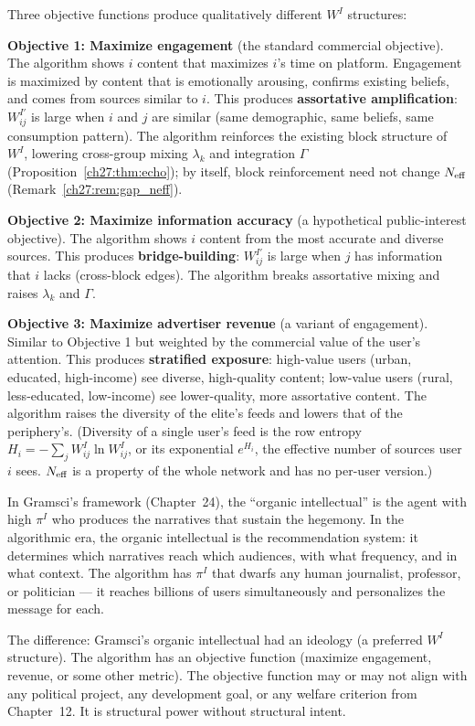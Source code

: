 \documentclass[../structural_economics_book.tex]{subfiles}
\begin{document}
\begin{conjecture}\label{ch27:prop:objective}
Three objective functions produce qualitatively different $W^I$ structures:

\textbf{Objective 1: Maximize engagement} (the standard commercial objective). The algorithm shows $i$ content that maximizes $i$'s time on platform. Engagement is maximized by content that is emotionally arousing, confirms existing beliefs, and comes from sources similar to $i$. This produces \textbf{assortative amplification}: $W^{I'}_{ij}$ is large when $i$ and $j$ are similar (same demographic, same beliefs, same consumption pattern). The algorithm reinforces the existing block structure of $W^I$, lowering cross-group mixing $\lambda_k$ and integration $\Gamma$ (Proposition~\ref{ch27:thm:echo}); by itself, block reinforcement need not change $N_{\text{eff}}$ (Remark~\ref{ch27:rem:gap_neff}).

\textbf{Objective 2: Maximize information accuracy} (a hypothetical public-interest objective). The algorithm shows $i$ content from the most accurate and diverse sources. This produces \textbf{bridge-building}: $W^{I'}_{ij}$ is large when $j$ has information that $i$ lacks (cross-block edges). The algorithm breaks assortative mixing and raises $\lambda_k$ and $\Gamma$.

\textbf{Objective 3: Maximize advertiser revenue} (a variant of engagement). Similar to Objective 1 but weighted by the commercial value of the user's attention. This produces \textbf{stratified exposure}: high-value users (urban, educated, high-income) see diverse, high-quality content; low-value users (rural, less-educated, low-income) see lower-quality, more assortative content. The algorithm raises the diversity of the elite's feeds and lowers that of the periphery's. (Diversity of a single user's feed is the row entropy $H_i = -\sum_j W^I_{ij}\ln W^I_{ij}$, or its exponential $e^{H_i}$, the effective number of sources user $i$ sees. $N_{\text{eff}}$ is a property of the whole network and has no per-user version.)
\end{conjecture}

\begin{intuition}
In Gramsci's framework (Chapter~24), the ``organic intellectual'' is the agent with high $\pi^I$ who produces the narratives that sustain the hegemony. In the algorithmic era, the organic intellectual is the recommendation system: it determines which narratives reach which audiences, with what frequency, and in what context. The algorithm has $\pi^I$ that dwarfs any human journalist, professor, or politician --- it reaches billions of users simultaneously and personalizes the message for each.

The difference: Gramsci's organic intellectual had an ideology (a preferred $W^I$ structure). The algorithm has an objective function (maximize engagement, revenue, or some other metric). The objective function may or may not align with any political project, any development goal, or any welfare criterion from Chapter~12. It is structural power without structural intent.
\end{intuition}
\end{document}
